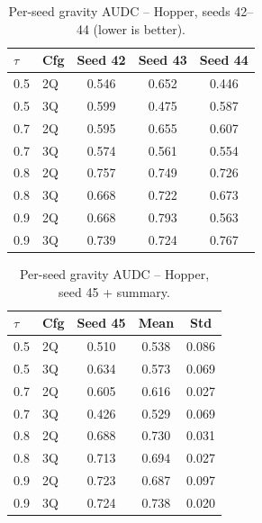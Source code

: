 \documentclass[conference]{IEEEtran}
\begin{document}
\begin{table}[t]
  \centering
  \caption{Per-seed gravity AUDC -- Hopper, seeds 42--44
           (lower is better).}
  \small
  \begin{tabular}{llccc}
    \toprule
    $\tau$ & Cfg & Seed 42 & Seed 43 & Seed 44 \\
    \midrule
    0.5 & 2Q & 0.546 & 0.652 & 0.446 \\
    0.5 & 3Q & 0.599 & 0.475 & 0.587 \\
    0.7 & 2Q & 0.595 & 0.655 & 0.607 \\
    0.7 & 3Q & 0.574 & 0.561 & 0.554 \\
    0.8 & 2Q & 0.757 & 0.749 & 0.726 \\
    0.8 & 3Q & 0.668 & 0.722 & 0.673 \\
    0.9 & 2Q & 0.668 & 0.793 & 0.563 \\
    0.9 & 3Q & 0.739 & 0.724 & 0.767 \\
    \bottomrule
  \end{tabular}
\end{table}

\begin{table}[t]
  \centering
  \caption{Per-seed gravity AUDC -- Hopper, seed 45 + summary.}
  \small
  \begin{tabular}{llccc}
    \toprule
    $\tau$ & Cfg & Seed 45 & Mean & Std \\
    \midrule
    0.5 & 2Q & 0.510 & 0.538 & 0.086 \\
    0.5 & 3Q & 0.634 & 0.573 & 0.069 \\
    0.7 & 2Q & 0.605 & 0.616 & 0.027 \\
    0.7 & 3Q & 0.426 & 0.529 & 0.069 \\
    0.8 & 2Q & 0.688 & 0.730 & 0.031 \\
    0.8 & 3Q & 0.713 & 0.694 & 0.027 \\
    0.9 & 2Q & 0.723 & 0.687 & 0.097 \\
    0.9 & 3Q & 0.724 & 0.738 & 0.020 \\
    \bottomrule
  \end{tabular}
\end{table}
\end{document}

